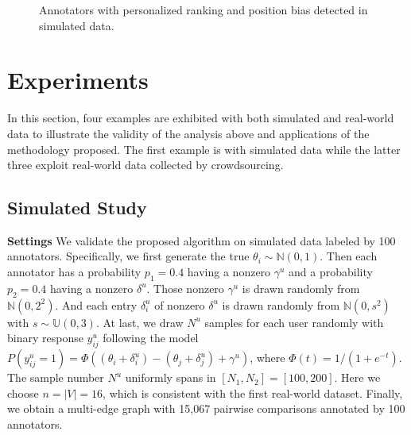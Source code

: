 \documentclass[10pt,journal,cspaper,compsoc]{IEEEtran}
\def\N{{\mathbb N}}
\begin{document}
{\begin{figure}[t]
\begin{center}
  \caption{Annotators with personalized ranking and position bias detected in simulated data.}
\end{center}
\end{figure}


\section{Experiments}\label{sec:experiment}

In this section, four examples are exhibited with both
simulated and real-world data to illustrate the validity of
the analysis above and applications of the methodology proposed.
The first example is with simulated data while the
latter three exploit real-world data collected by crowdsourcing.

\subsection{Simulated Study}
\textbf{Settings} We validate the proposed algorithm on simulated data labeled by 100 annotators.
Specifically, we first generate the true $\theta_i \sim \N(0,1)$.
Then each annotator has a probability $p_1 = 0.4$ having a nonzero $\gamma^u$ and a probability $p_2 = 0.4$ having a nonzero $\delta^u$.
Those nonzero $\gamma^u$ is drawn randomly from $\N(0,2^2)$. And each entry $\delta_i^u$ of nonzero $\delta^u$ is drawn randomly from $\N(0,s^2)$ with $s \sim \mathbb{U}(0,3)$.
At last, we draw $N^u$ samples for each user randomly with binary response $y^u_{ij}$ following the model $P(y^u_{ij} = 1) = \Phi((\theta_i+\delta_i^u) - (\theta_j+\delta_j^u) + \gamma^u)$, where $\Phi(t) = 1/(1+e^{-t})$.
 The sample number $N^u$ uniformly spans in $[N_1,N_2] = [100,200]$. Here we choose $n=|V|=16$, which is consistent with the first real-world dataset.  Finally, we obtain a multi-edge graph with 15,067 pairwise comparisons annotated by 100 annotators.





}
\end{document}
